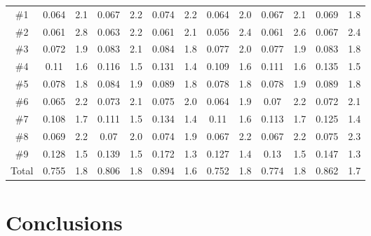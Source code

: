\documentclass[sensors,article,accept,moreauthors,pdftex,10pt,a4paper]{mdpi}
\begin{document}
\begin{table}[H]
{\begin{tabular}{ccccccccccccc}
          
\#1         & 0.064      & 2.1  & 0.067     & 2.2 & 0.074     & 2.2 & 0.064     & 2.0 & 0.067     & 2.1 & 0.069     & 1.8 \\
\#2         & 0.061      & 2.8  & 0.063     & 2.2 & 0.061     & 2.1 & 0.056     & 2.4 & 0.061     & 2.6 & 0.067     & 2.4 \\
\#3         & 0.072      & 1.9  & 0.083     & 2.1 & 0.084     & 1.8 & 0.077     & 2.0 & 0.077     & 1.9 & 0.083     & 1.8 \\
\#4         & 0.11       & 1.6  & 0.116     & 1.5 & 0.131     & 1.4 & 0.109     & 1.6 & 0.111     & 1.6 & 0.135     & 1.5 \\
\#5         & 0.078      & 1.8  & 0.084     & 1.9 & 0.089     & 1.8 & 0.078     & 1.8 & 0.078     & 1.9 & 0.089     & 1.8 \\
\#6         & 0.065      & 2.2  & 0.073     & 2.1 & 0.075     & 2.0 & 0.064     & 1.9 & 0.07     & 2.2 & 0.072     & 2.1 \\
\#7         & 0.108      & 1.7  & 0.111     & 1.5 & 0.134     & 1.4 & 0.11     & 1.6 & 0.113     & 1.7 & 0.125     & 1.4 \\
\#8         & 0.069      & 2.2  & 0.07     & 2.0 & 0.074     & 1.9 & 0.067     & 2.2 & 0.067     & 2.2 & 0.075     & 2.3 \\
\#9         & 0.128      & 1.5  & 0.139     & 1.5 & 0.172     & 1.3 & 0.127     & 1.4 & 0.13     & 1.5 & 0.147     & 1.3 \\
Total        & 0.755      & 1.8  & 0.806     & 1.8 & 0.894     & 1.6 & 0.752     & 1.8 & 0.774     & 1.8 & 0.862     & 1.7 \\
\bottomrule

\end{tabular}
}
\end{table}






\section{Conclusions}
\end{document}
